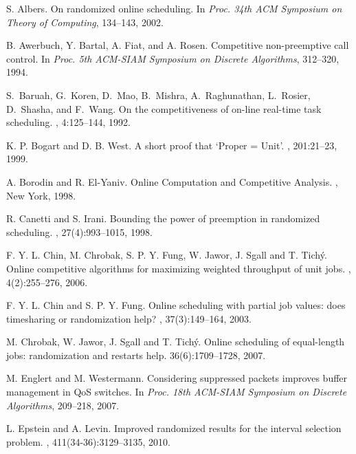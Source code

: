 \documentclass[11pt]{article}
\begin{document}
\begin{thebibliography}{10}

 S. Albers.
\newblock On randomized online scheduling.
\newblock In {\em Proc. 34th ACM Symposium on Theory of Computing},
134--143, 2002.

B. Awerbuch, Y. Bartal, A. Fiat, and A. Rosen.
\newblock Competitive non-preemptive call control.
\newblock In {\em Proc. 5th ACM-SIAM Symposium on Discrete
  Algorithms}, 312--320, 1994.

S.~Baruah, G.~Koren, D.~Mao, B.~Mishra, A.~Raghunathan, L.~Rosier, D.~Shasha,
  and F.~Wang.
\newblock On the competitiveness of on-line real-time task scheduling.
, 4:125--144, 1992.

K. P. Bogart and D. B. West.
\newblock A short proof that `Proper = Unit'.
, 201:21--23, 1999.

A. Borodin and R. El-Yaniv.
\newblock Online Computation and Competitive Analysis.
, New York, 1998.

R. Canetti and S. Irani.
\newblock Bounding the power of preemption in randomized scheduling.
, 27(4):993--1015, 1998.

F. Y. L. Chin, M. Chrobak, S. P. Y. Fung, W. Jawor,
J. Sgall and T. Tich\'y.
\newblock Online competitive algorithms for maximizing weighted throughput 
of unit jobs.
, 4(2):255--276, 2006.

F. Y. L. Chin and S. P. Y. Fung.
\newblock Online scheduling with partial job values: does
timesharing or randomization help?
, 37(3):149--164, 2003.

M. Chrobak, W. Jawor, J. Sgall and T. Tich\'y.
\newblock Online scheduling of equal-length jobs: randomization and restarts 
help. 
 36(6):1709--1728, 2007.





M. Englert and M. Westermann.
\newblock Considering suppressed packets improves buffer management
in QoS switches.
\newblock In {\em Proc. 18th ACM-SIAM Symposium on Discrete Algorithms}, 
209--218, 2007.

L. Epstein and A. Levin.
\newblock Improved randomized results for the interval selection problem.
, 411(34-36):3129--3135,
2010.


\end{thebibliography}
\end{document}
